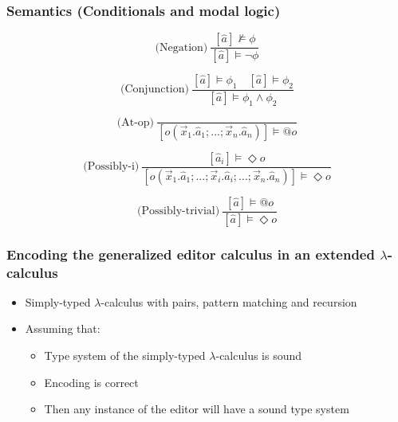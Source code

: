 \documentclass[t,24pt,aspectratio=169]{beamer}
\begin{document}
\begin{frame}
    \frametitle{Semantics (Conditionals and modal logic)}
    \[
        \text{(Negation)} \ \frac{[\hat{a}] \not\models \phi}{[\hat{a}] \models \neg \phi}
    \]

    \[
        \text{(Conjunction)} \ \frac{[\hat{a}] \models \phi_1 \quad [\hat{a}] \models \phi_2}{[\hat{a}] \models \phi_1 \land \phi_2}
    \]

    \vspace{0.3cm}

    \[
        \text{(At-op)} \ \frac{}{[o(\vec{x}_1.\hat{a}_1;...;\vec{x}_n.\hat{a}_n)] \models @o}
    \]

    \[
        \text{(Possibly-i)} \ \frac{[\hat{a}_i] \models \Diamond o}{[o(\vec{x}_1.\hat{a}_1;...;\Vec{x}_i.\hat{a}_i;...;\vec{x}_n.\hat{a}_n)] \models \Diamond o}
    \]

    \[
        \text{(Possibly-trivial)} \ \frac{[\hat{a}] \models @o}{[\hat{a}] \models \Diamond o}
    \]

\end{frame}


\begin{frame}[hvid]
    \frametitle{Encoding the generalized editor calculus in an extended $\lambda$-calculus}
    \begin{itemize}
        \item Simply-typed $\lambda$-calculus with pairs, pattern matching and recursion
        \item Assuming that:
              \begin{itemize}
                  \item Type system of the simply-typed $\lambda$-calculus is sound
                  \item Encoding is correct
                  \item Then any instance of the editor will have a sound type system
              \end{itemize}
    \end{itemize}
\end{frame}
\end{document}
